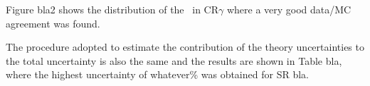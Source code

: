 	
	Figure bla2 shows the distribution of the \met\ in CR$\gamma$ where a very good data/MC agreement was found.
	
	The procedure adopted to estimate the contribution of the theory uncertainties to the total uncertainty is also the same and the results are shown in Table bla, where the highest uncertainty of whatever\% was obtained for SR bla. 
